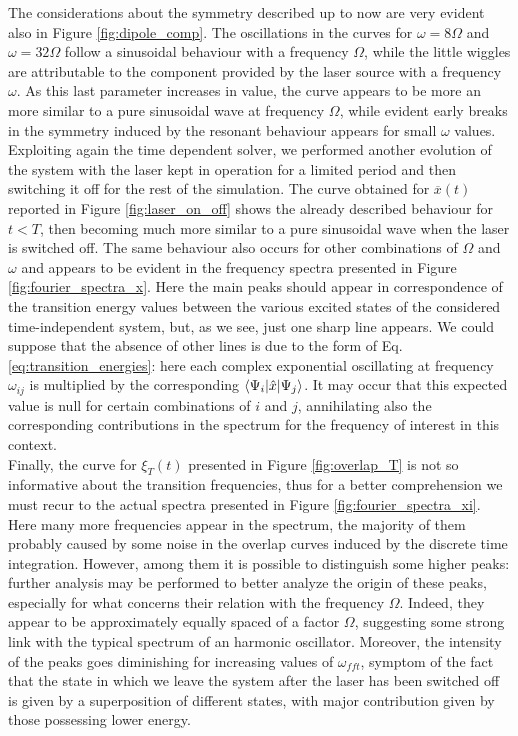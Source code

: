 The considerations about the symmetry described up to now are very evident also in Figure \ref{fig:dipole_comp}. The oscillations in the curves for $\omega=8\Omega$ and $\omega=32\Omega$ follow a sinusoidal behaviour with a frequency $\Omega$, while the little wiggles are attributable to the component provided by the laser source with a frequency $\omega$. As this last parameter increases in value, the curve appears to be more an more similar to a pure sinusoidal wave at frequency $\Omega$, while evident early breaks in the symmetry induced by the resonant behaviour appears for small $\omega$ values. \\


Exploiting again the time dependent solver, we performed another evolution of the system with the laser kept in operation for a limited period and then switching it off for the rest of the simulation. The curve obtained for $\overline{x}(t)$ reported in Figure \ref{fig:laser_on_off} shows the already described behaviour for $t<T$, then becoming much more similar to a pure sinusoidal wave when the laser is switched off. The same behaviour also occurs for other combinations of $\Omega$ and $\omega$ and appears to be evident in the frequency spectra presented in Figure \ref{fig:fourier_spectra_x}. Here the main peaks should appear in correspondence of the transition energy values between the various excited states of the considered time-independent system, but, as we see, just one sharp line appears. We could suppose that the absence of other lines is due to the form of Eq.\,\ref{eq:transition_energies}: here each complex exponential oscillating at frequency $\omega_{ij}$ is multiplied by the corresponding $\bracketOP{\Psi_i}{\Psi_j}{\hat{x}}$. It may occur that this expected value is null for certain combinations of $i$ and $j$, annihilating also the corresponding contributions in the spectrum for the frequency of interest in this context. \\

Finally, the curve for $\xi_T(t)$ presented in Figure \ref{fig:overlap_T} is not so informative about the transition frequencies, thus for a better comprehension we must recur to the actual spectra presented in Figure \ref{fig:fourier_spectra_xi}. Here many more frequencies appear in the spectrum, the majority of them probably caused by some noise in the overlap curves induced by the discrete time integration. However, among them it is possible to distinguish some higher peaks: further analysis may be performed to better analyze the origin of these peaks, especially for what concerns their relation with the frequency $\Omega$. Indeed, they appear to be approximately equally spaced of a factor $\Omega$, suggesting some strong link with the typical spectrum of an harmonic oscillator. Moreover, the intensity of the peaks goes diminishing for increasing values of $\omega_{fft}$, symptom of the fact that the state in which we leave the system after the laser has been switched off is given by a superposition of different states, with major contribution given by those possessing lower energy. 

